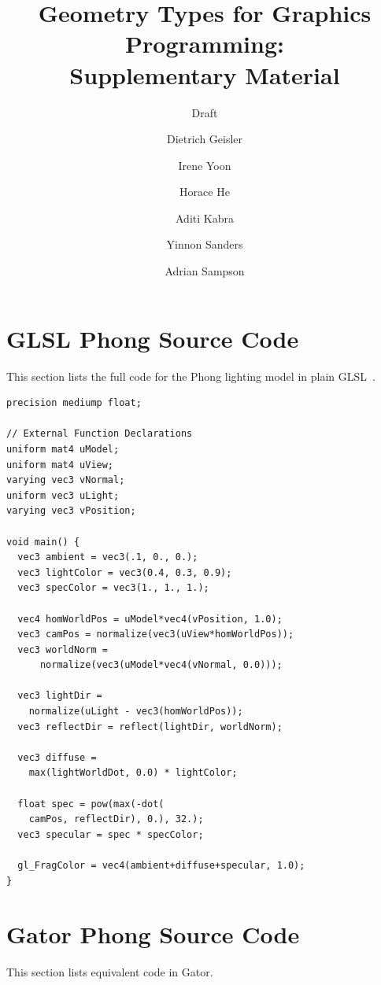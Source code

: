 \documentclass[acmsmall,review,anonymous]{acmart}
\title{Geometry Types for Graphics Programming:
    \\ Supplementary Material}
\author{Dietrich Geisler}
\author{Irene Yoon}
\author{Horace He}
\author{Aditi Kabra}
\author{Yinnon Sanders}
\author{Adrian Sampson}
\affiliation{%
  \institution{Cornell University}
  \city{Ithaca}
  \state{New York}
  \postcode{14853}
}
\date{}
\subtitle{Draft \Revision}
\newcommand{\lang}{Gator\xspace}
\begin{document}
\renewcommand\thesection{\Alph{section}}
\setcounter{lemma}{0}
\maketitle

\section{GLSL Phong Source Code}
\label{app:llphong}

This section lists the full code for the Phong lighting model in plain GLSL~\cite{glsl}.

\begin{verbatim}
precision mediump float;

// External Function Declarations
uniform mat4 uModel;
uniform mat4 uView;
varying vec3 vNormal;
uniform vec3 uLight;
varying vec3 vPosition;

void main() {
  vec3 ambient = vec3(.1, 0., 0.);
  vec3 lightColor = vec3(0.4, 0.3, 0.9);
  vec3 specColor = vec3(1., 1., 1.);

  vec4 homWorldPos = uModel*vec4(vPosition, 1.0);
  vec3 camPos = normalize(vec3(uView*homWorldPos));
  vec3 worldNorm = 
	  normalize(vec3(uModel*vec4(vNormal, 0.0)));

  vec3 lightDir = 
    normalize(uLight - vec3(homWorldPos));
  vec3 reflectDir = reflect(lightDir, worldNorm);

  vec3 diffuse = 
    max(lightWorldDot, 0.0) * lightColor;

  float spec = pow(max(-dot(
    camPos, reflectDir), 0.), 32.);
  vec3 specular = spec * specColor;

  gl_FragColor = vec4(ambient+diffuse+specular, 1.0);
}
\end{verbatim}

\section{\lang Phong Source Code}
\label{app:hlphong}

This section lists equivalent code in \lang.
\end{document}
